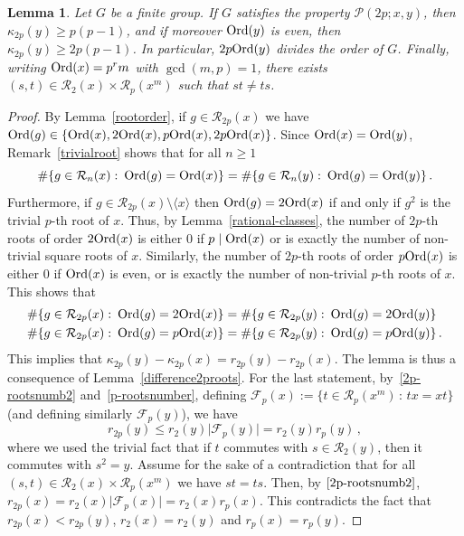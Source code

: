 \documentclass[12pt]{amsart}
\numberwithin{equation}{section}
\newcommand{\Ord}{{\rm Ord}}
\newtheorem{lem}[X]{Lemma}
\theoremstyle{definition}
\theoremstyle{remark}
\begin{document}
\begin{lem}\label{primitive2proots}
    Let $G$ be a finite group. If $G$ satisfies the property $\mathcal{P}(2p;x,y)$, then $\kappa_{2p}(y)\ge p(p-1)$, and if moreover $\Ord(y)$ is even, then $\kappa_{2p}(y)\ge 2p(p-1)$. In particular, $2p\Ord(y)$ divides the order of $G$. Finally, writing $\Ord(x)=p^r m$ with $\gcd(m,p)=1$, there exists $(s,t)\in \mathcal{R}_2(x)\times \mathcal{R}_p(x^{m})$ such that $st\ne ts$.
\end{lem}
\begin{proof}
    By Lemma~\ref{rootorder}, if $g\in \mathcal{R}_{2p}(x)$ we have $\Ord(g)\in\{\Ord(x),2\Ord(x),p\Ord(x),2p\Ord(x)\}$. Since $\Ord(x)=\Ord(y)$, Remark~\ref{trivialroot} shows that for all $n\ge 1$ \[\#\{ g\in \mathcal{R}_n(x)\, \colon\,  \Ord(g)=\Ord(x)\}=\#\{ g\in \mathcal{R}_n(y)\, \colon\,  \Ord(g)=\Ord(y)\}\, .\]
    Furthermore, if $g\in \mathcal{R}_{2p}(x)\setminus \langle x\rangle$ then $\Ord(g)=2\Ord(x)$ if and only if $g^2$ is the trivial $p$-th root of $x$. Thus, by Lemma~\ref{rational-classes}, the number of $2p$-th roots of order $2\Ord(x)$ is either $0$ if $p\mid \Ord(x)$ or is exactly the number of non-trivial square roots of $x$. Similarly, the number of $2p$-th roots of order $p\Ord(x)$ is either $0$ if $\Ord(x)$ is even, or is exactly the number of non-trivial $p$-th roots of $x$. This shows that \begin{align*}
        \#\{ g\in \mathcal{R}_{2p}(x)\, \colon\,  \Ord(g)=2\Ord(x)\}&=\#\{ g\in \mathcal{R}_{2p}(y)\, \colon\,  \Ord(g)=2\Ord(y)\}\\
        \#\{ g\in \mathcal{R}_{2p}(x)\, \colon\,  \Ord(g)=p\Ord(x)\}&=\#\{ g\in \mathcal{R}_{2p}(y)\, \colon\,  \Ord(g)=p\Ord(y)\}\, .
    \end{align*}
    This implies that $\kappa_{2p}(y)-\kappa_{2p}(x)=r_{2p}(y)-r_{2p}(x)$. The lemma is thus a consequence of Lemma~\ref{difference2proots}. For the last statement, by~\eqref{2p-rootsnumb2} and~\eqref{p-rootsnumber}, defining $\mathcal{F}_p(x):=\{t\in \mathcal{R}_p(x^m)\, :\, tx=xt\}$ (and defining similarly $\mathcal{F}_p(y)$), we have
    \[r_{2p}(y)\le r_2(y)\bigl| \mathcal{F}_p(y)\bigr|=  r_2(y)r_p(y)\, ,\]
    where we used the trivial fact that if $t$ commutes with $s\in \mathcal{R}_2(y)$, then it commutes with $s^2=y$. Assume for the sake of a contradiction that for all $(s,t)\in \mathcal{R}_2(x)\times \mathcal{R}_p(x^{m})$ we have $st=ts$. Then, by $\eqref{2p-rootsnumb2}$, $r_{2p}(x)=r_2(x)\bigl| \mathcal{F}_p(x)\bigr|=r_2(x)r_p(x)$. This contradicts the fact that $r_{2p}(x)<r_{2p}(y)$, $r_2(x)=r_2(y)$ and $r_{p}(x)=r_{p}(y)$.
\end{proof}
\end{document}
